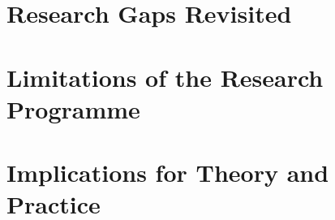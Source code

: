 \section{Research Gaps Revisited}
\label{sec:disc_gaps}


\section{Limitations of the Research Programme}
\label{sec:disc_limitations}


\section{Implications for Theory and Practice}
\label{sec:disc_implications}



